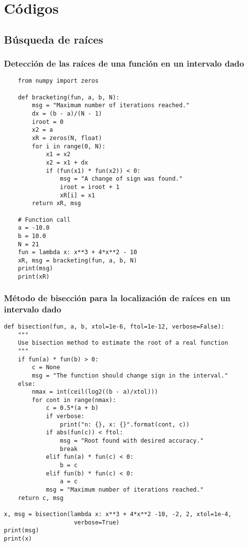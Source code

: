\graphicspath{{img/algor/}}
\chapter{Códigos}


\section{Búsqueda de raíces}

\subsection{Detección de las raíces de una función en un intervalo dado}
\begin{verbatim}
    from numpy import zeros
    
    def bracketing(fun, a, b, N):
        msg = "Maximum number of iterations reached."
        dx = (b - a)/(N - 1)
        iroot = 0
        x2 = a
        xR = zeros(N, float)
        for i in range(0, N):
            x1 = x2
            x2 = x1 + dx
            if (fun(x1) * fun(x2)) < 0:
                msg = "A change of sign was found."
                iroot = iroot + 1
                xR[i] = x1
        return xR, msg

    # Function call
    a = -10.0
    b = 10.0
    N = 21
    fun = lambda x: x**3 + 4*x**2 - 10
    xR, msg = bracketing(fun, a, b, N)
    print(msg)
    print(xR)
\end{verbatim}


\subsection{Método de bisección para la localización de raíces en un intervalo 
dado}

\begin{verbatim}
def bisection(fun, a, b, xtol=1e-6, ftol=1e-12, verbose=False):
    """
    Use bisection method to estimate the root of a real function
    """
    if fun(a) * fun(b) > 0:
        c = None
        msg = "The function should change sign in the interval."
    else:
        nmax = int(ceil(log2((b - a)/xtol)))
        for cont in range(nmax):
            c = 0.5*(a + b)
            if verbose:
                print("n: {}, x: {}".format(cont, c))
            if abs(fun(c)) < ftol:
                msg = "Root found with desired accuracy."
                break
            elif fun(a) * fun(c) < 0:
                b = c
            elif fun(b) * fun(c) < 0:
                a = c
            msg = "Maximum number of iterations reached."
    return c, msg

x, msg = bisection(lambda x: x**3 + 4*x**2 -10, -2, 2, xtol=1e-4,
                    verbose=True)
print(msg)
print(x)
\end{verbatim}



